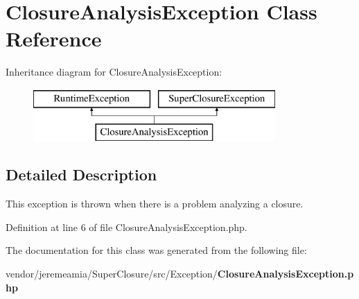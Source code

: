 \section{Closure\+Analysis\+Exception Class Reference}
\label{class_super_closure_1_1_exception_1_1_closure_analysis_exception}
Inheritance diagram for Closure\+Analysis\+Exception\+:\begin{figure}[H]
\begin{center}
\leavevmode
\includegraphics[height=2.000000cm]{class_super_closure_1_1_exception_1_1_closure_analysis_exception}
\end{center}
\end{figure}


\subsection{Detailed Description}
This exception is thrown when there is a problem analyzing a closure. 

Definition at line 6 of file Closure\+Analysis\+Exception.\+php.



The documentation for this class was generated from the following file\+:\begin{DoxyCompactItemize}
\item 
vendor/jeremeamia/\+Super\+Closure/src/\+Exception/{\bf Closure\+Analysis\+Exception.\+php}\end{DoxyCompactItemize}
